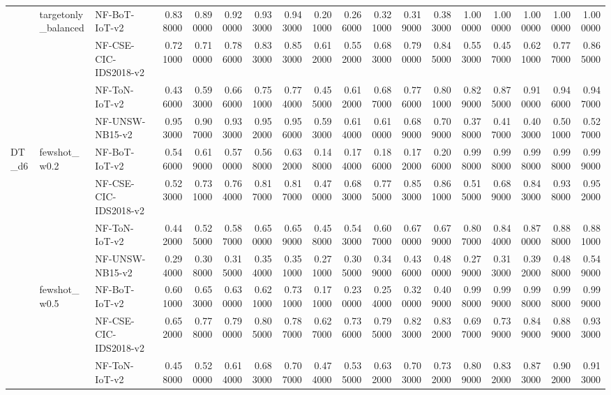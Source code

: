\begin{tabular}{lllrrrrrrrrrrrrrrr}
\cline{2-18}
 & \multirow[t]{4}{*}{targetonly_balanced} & NF-BoT-IoT-v2 & 0.838000 & 0.890000 & 0.920000 & 0.933000 & 0.943000 & 0.201000 & 0.266000 & 0.321000 & 0.319000 & 0.383000 & 1.000000 & 1.000000 & 1.000000 & 1.000000 & 1.000000 \\
 &  & NF-CSE-CIC-IDS2018-v2 & 0.721000 & 0.710000 & 0.786000 & 0.833000 & 0.853000 & 0.612000 & 0.552000 & 0.683000 & 0.790000 & 0.845000 & 0.553000 & 0.457000 & 0.621000 & 0.777000 & 0.865000 \\
 &  & NF-ToN-IoT-v2 & 0.436000 & 0.593000 & 0.666000 & 0.751000 & 0.774000 & 0.455000 & 0.612000 & 0.687000 & 0.776000 & 0.801000 & 0.829000 & 0.875000 & 0.910000 & 0.946000 & 0.947000 \\
 &  & NF-UNSW-NB15-v2 & 0.953000 & 0.907000 & 0.933000 & 0.952000 & 0.956000 & 0.593000 & 0.614000 & 0.610000 & 0.689000 & 0.709000 & 0.378000 & 0.417000 & 0.403000 & 0.501000 & 0.527000 \\
\cline{1-18} \cline{2-18}
\multirow[t]{24}{*}{DT_d6} & \multirow[t]{4}{*}{fewshot_w0.2} & NF-BoT-IoT-v2 & 0.546000 & 0.619000 & 0.570000 & 0.568000 & 0.632000 & 0.148000 & 0.174000 & 0.186000 & 0.172000 & 0.206000 & 0.998000 & 0.998000 & 0.998000 & 0.998000 & 0.999000 \\
 &  & NF-CSE-CIC-IDS2018-v2 & 0.523000 & 0.731000 & 0.764000 & 0.817000 & 0.817000 & 0.470000 & 0.683000 & 0.775000 & 0.853000 & 0.861000 & 0.515000 & 0.689000 & 0.843000 & 0.938000 & 0.952000 \\
 &  & NF-ToN-IoT-v2 & 0.442000 & 0.525000 & 0.587000 & 0.650000 & 0.659000 & 0.458000 & 0.543000 & 0.607000 & 0.670000 & 0.679000 & 0.807000 & 0.844000 & 0.870000 & 0.888000 & 0.881000 \\
 &  & NF-UNSW-NB15-v2 & 0.294000 & 0.308000 & 0.315000 & 0.354000 & 0.351000 & 0.271000 & 0.305000 & 0.349000 & 0.436000 & 0.480000 & 0.279000 & 0.313000 & 0.392000 & 0.488000 & 0.549000 \\
\cline{2-18}
 & \multirow[t]{4}{*}{fewshot_w0.5} & NF-BoT-IoT-v2 & 0.601000 & 0.653000 & 0.630000 & 0.621000 & 0.731000 & 0.171000 & 0.230000 & 0.254000 & 0.320000 & 0.409000 & 0.998000 & 0.999000 & 0.998000 & 0.998000 & 0.999000 \\
 &  & NF-CSE-CIC-IDS2018-v2 & 0.652000 & 0.778000 & 0.790000 & 0.805000 & 0.787000 & 0.627000 & 0.736000 & 0.795000 & 0.823000 & 0.832000 & 0.697000 & 0.739000 & 0.849000 & 0.889000 & 0.933000 \\
 &  & NF-ToN-IoT-v2 & 0.458000 & 0.520000 & 0.614000 & 0.683000 & 0.707000 & 0.474000 & 0.535000 & 0.632000 & 0.703000 & 0.732000 & 0.809000 & 0.832000 & 0.873000 & 0.902000 & 0.913000 \\

\end{tabular}
